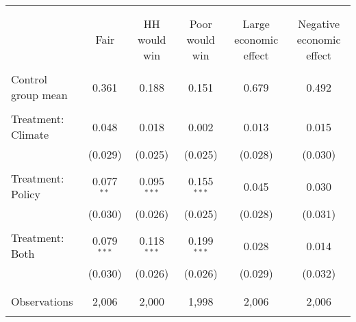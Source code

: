 
\begin{tabular}{@{\extracolsep{5pt}}lccccc} 
\\[-1.8ex]\hline 
\hline \\[-1.8ex] 
\\[-1.8ex] & Fair & HH would win & Poor would win & Large economic effect & Negative economic effect \\ 
\hline \\[-1.8ex] 
 Control group mean & 0.361 & 0.188 & 0.151 & 0.679 & 0.492  \\ \hline \\[-1.8ex] Treatment: Climate & 0.048 & 0.018 & 0.002 & 0.013 & 0.015 \\ 
  & (0.029) & (0.025) & (0.025) & (0.028) & (0.030) \\ 
  & & & & & \\ 
 Treatment: Policy & 0.077$^{**}$ & 0.095$^{***}$ & 0.155$^{***}$ & 0.045 & 0.030 \\ 
  & (0.030) & (0.026) & (0.025) & (0.028) & (0.031) \\ 
  & & & & & \\ 
 Treatment: Both & 0.079$^{***}$ & 0.118$^{***}$ & 0.199$^{***}$ & 0.028 & 0.014 \\ 
  & (0.030) & (0.026) & (0.026) & (0.029) & (0.032) \\ 
  & & & & & \\ 
\hline \\[-1.8ex] 

Observations & 2,006 & 2,000 & 1,998 & 2,006 & 2,006 \\ 
\hline 
\hline \\[-1.8ex] 
\end{tabular} 
